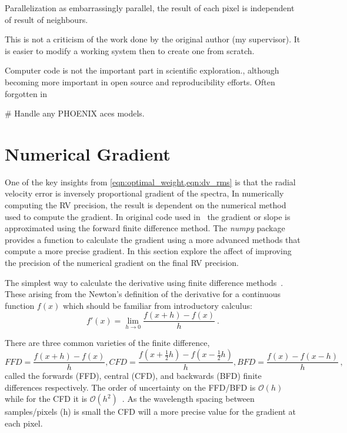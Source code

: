 {Parallelization as embarrassingly parallel, the result of each pixel is independent of result of neighbours.

This is not a criticism of the work done by the original author (my supervisor).
It is easier to modify a working system then to create one from scratch.

Computer code is not the important part in scientific exploration., although becoming more important in open source and reproducibility efforts.
Often forgotten in

\# Handle any {PHOENIX} aces models.


\section{Numerical Gradient}
\label{sec:numerical_gradient}
One of the key insights from \cref{eqn:optimal_weight,eqn:dv_rms} is that the radial velocity error is inversely proportional gradient of the spectra, In numerically computing the {RV} precision, the result is dependent on the numerical method used to compute the gradient.
In original code used in~\citet{figueira_radial_2016} the gradient or slope is approximated using the forward finite difference method.
The \emph{numpy} package provides a function to calculate the gradient using a more advanced methods that compute a more precise gradient.
In this section  explore the affect of improving the precision of the numerical gradient on the final {RV} precision.

The simplest way to calculate the derivative using finite difference methods~\citep{quarteroni_numerical_2000}.
These arising from the Newton's definition of the derivative for a continuous function \(f(x)\) which should be familiar from introductory calculus:
\[f'(x) = \lim_{h \to 0} \frac{f(x+h)-f(x)}{h}~.\]

There are three common varieties of the finite difference,
\begin{equation}
 {FFD} = \frac{f(x+h)-f(x)}{h}, {CFD}=\frac{f(x+\frac{1}{2}h)-f(x-\frac{1}{2}h)}{h}, {BFD}=\frac{f(x)-f(x-h)}{h}\,,
\end{equation}
called the forwards ({FFD}), central ({CFD}), and backwards ({BFD}) finite differences respectively.
The order of uncertainty on the {FFD}/{BFD} is \(\mathcal{O}(h)\) while for the {CFD} it is \(\mathcal{O}({h}^{2})\)~\citep{quarteroni_numerical_2000}.
As the wavelength spacing between samples/pixels (h) is small the {CFD} will a more precise value for the gradient at each pixel.

}
